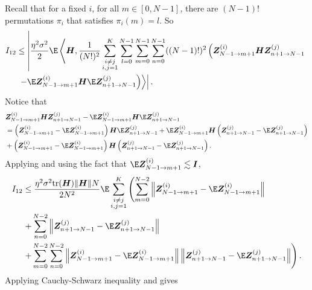 Recall that for a fixed $i$, for all $m\in[0,N-1]$, there are $(N-1)!$ permutations $\pi_i$ that satisfies $\pi_i(m)=l$. So
\begin{align*}
    I_{12}
    &\leq \left|\frac{\eta^2\sigma^2}{2}\E\left\langle \mH, \frac{1}{(N!)^2}\sum_{\substack{i\neq j \\i,j=1}}^K\sum_{l=0}^{N-1}\sum_{m=0}^{N-1}\sum_{n=0}^{N-1}((N-1)!)^2\left(\mZ_{N-1 \to m+1}^{(i)}\mH\mZ_{n+1 \to N-1}^{(j)}\right.\right.\right. \\
    &\left.\left.\left.-\E\mZ_{N-1 \to m+1}^{(i)}\mH\E\mZ_{n+1 \to N-1}^{(j)}\right)\right\rangle\right|. \\
\end{align*}
Notice that 
\begin{align*}
    &\mZ_{N-1 \to m+1}^{(i)}\mH\mZ_{n+1 \to N-1}^{(j)}-\E\mZ_{N-1 \to m+1}^{(i)}\mH\E\mZ_{n+1 \to N-1}^{(j)} \\
    &=\left(\mZ_{N-1 \to m+1}^{(i)}-\E\mZ_{N-1 \to m+1}^{(i)}\right)\mH\E\mZ_{n+1 \to N-1}^{(j)}+\E\mZ_{N-1 \to m+1}^{(i)}\mH\left(\mZ_{n+1 \to N-1}^{(j)}-\E\mZ_{n+1 \to N-1}^{(j)}\right) \\
    &+\left(\mZ_{N-1 \to m+1}^{(i)}-\E\mZ_{N-1 \to m+1}^{(i)}\right)\mH\left(\mZ_{n+1 \to N-1}^{(j)}-\E\mZ_{n+1 \to N-1}^{(j)}\right).
\end{align*}
Applying  and using the fact that $\E\mZ_{N-1 \to m+1}^{(i)}\lesssim\mI$, 
\begin{align*}
    I_{12}&\leq \frac{\eta^2\sigma^2\text{tr}(\mH)\|\mH\|N}{2N^2}\E\sum_{\substack{i\neq j \\i,j=1}}^K\left(\sum_{m=0}^{N-2}\left\|\mZ_{N-1 \to m+1}^{(i)}-\E\mZ_{N-1 \to m+1}^{(i)}\right\|\right.\\
    &\left.+\sum_{n=0}^{N-2}\left\|\mZ_{n+1 \to N-1}^{(j)}-\E\mZ_{n+1 \to N-1}^{(j)}\right\|\right. \\
    &\left.+\sum_{m=0}^{N-2}\sum_{n=0}^{N-2}\left\|\mZ_{N-1 \to m+1}^{(i)}-\E\mZ_{N-1 \to m+1}^{(i)}\right\|\left\|\mZ_{n+1 \to N-1}^{(j)}-\E\mZ_{n+1 \to N-1}^{(j)}\right\|\right). \\
\end{align*}
Applying Cauchy-Schwarz inequality and  gives
